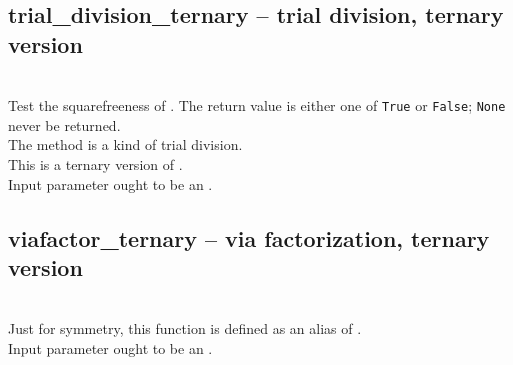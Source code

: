  \subsection{trial\_division\_ternary  -- trial division, ternary version}
 \\
 \spacing
 \quad Test the squarefreeness of .
 The return value is either one of {\tt True} or {\tt False};
 {\tt None} never be returned. \\
 \spacing
 The method is a kind of trial division. \\
 This is a ternary version of .\\
 \spacing
 \quad Input parameter  ought to be an .
% 
 \subsection{viafactor\_ternary -- via factorization, ternary version}
 \\
 \spacing
 \quad Just for symmetry, this function is defined as an alias of . \\
 \spacing
 \spacing
 \quad Input parameter  ought to be an .
% 
\C



